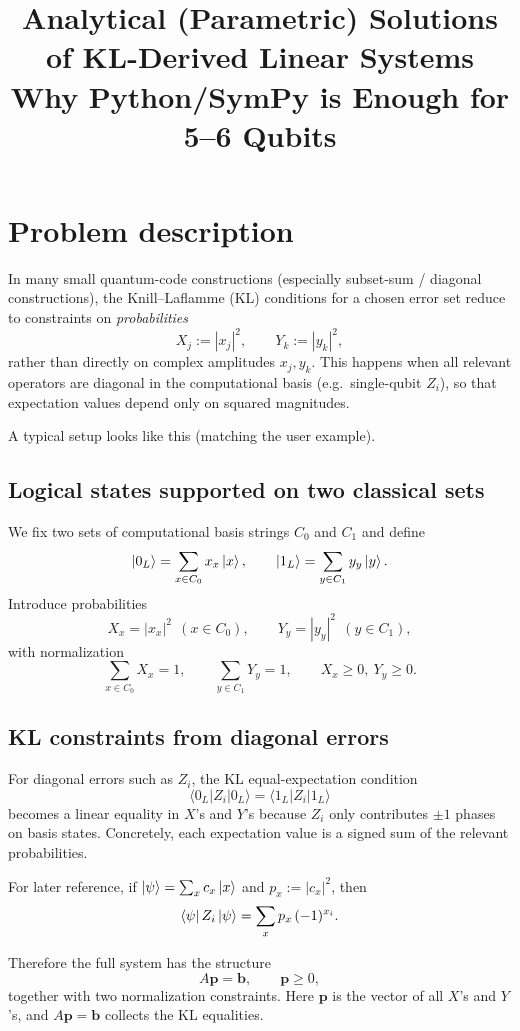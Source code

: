\documentclass[11pt]{article}
\title{Analytical (Parametric) Solutions of KL-Derived Linear Systems \\ \large Why Python/SymPy is Enough for 5--6 Qubits}
\author{}
\date{}
\begin{document}
\maketitle

\section{Problem description}

In many small quantum-code constructions (especially subset-sum / diagonal constructions), the Knill--Laflamme (KL) conditions for a chosen error set reduce to constraints on \emph{probabilities}
\[
X_j := |x_j|^2,\qquad Y_k := |y_k|^2,
\]
rather than directly on complex amplitudes $x_j,y_k$. This happens when all relevant operators are diagonal in the computational basis (e.g.\ single-qubit $Z_i$), so that expectation values depend only on squared magnitudes.

A typical setup looks like this (matching the user example).

\subsection*{Logical states supported on two classical sets}
We fix two sets of computational basis strings $C_0$ and $C_1$ and define
\[
\ket{0_L}=\sum_{x\in C_0} x_x \ket{x},\qquad
\ket{1_L}=\sum_{y\in C_1} y_y \ket{y}.
\]
Introduce probabilities
\[
X_x = |x_x|^2\ \ (x\in C_0), \qquad Y_y = |y_y|^2\ \ (y\in C_1),
\]
with normalization
\[
\sum_{x\in C_0} X_x = 1,\qquad \sum_{y\in C_1} Y_y = 1,
\qquad X_x\ge 0,\ Y_y\ge 0.
\]

\subsection*{KL constraints from diagonal errors}
For diagonal errors such as $Z_i$, the KL equal-expectation condition
\[
\langle 0_L|Z_i|0_L\rangle=\langle 1_L|Z_i|1_L\rangle
\]
becomes a linear equality in $X$'s and $Y$'s because $Z_i$ only contributes $\pm 1$ phases on basis states. Concretely, each expectation value is a signed sum of the relevant probabilities.

For later reference, if $\ket{\psi}=\sum_x c_x\ket{x}$ and $p_x:=|c_x|^2$, then
\begin{equation}
\label{eq:Zi-diagonal}
\bra{\psi}Z_i\ket{\psi}=\sum_x p_x\,(-1)^{x_i}.
\end{equation}


Therefore the full system has the structure
\[
A\mathbf{p} = \mathbf{b},\qquad \mathbf{p}\ge 0,
\]
together with two normalization constraints. Here $\mathbf{p}$ is the vector of all $X$'s and $Y$'s, and $A\mathbf{p}=\mathbf{b}$ collects the KL equalities.
\end{document}
